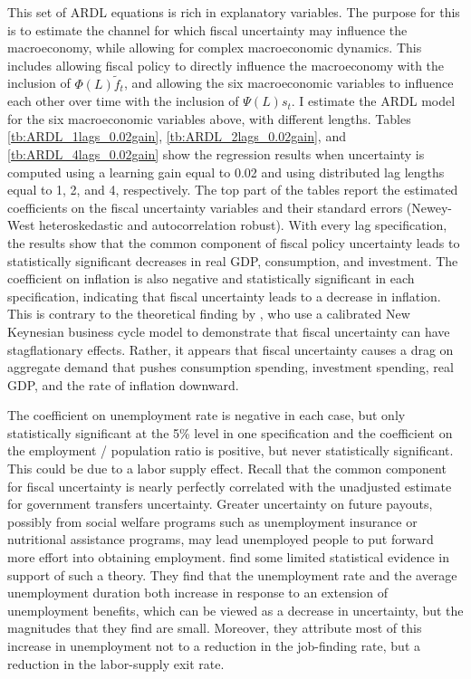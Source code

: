 \documentclass[11pt]{article}
\newcommand{\citee}[1]{\citet{#1}}
\begin{document}
This set of ARDL equations is rich in explanatory variables.  The purpose for this is to estimate the channel for which fiscal uncertainty may influence the macroeconomy, while allowing for complex macroeconomic dynamics.  This includes allowing fiscal policy to directly influence the macroeconomy with the inclusion of $\Phi(L) \tilde{f}_{t}$, and allowing the six macroeconomic variables to influence each other over time with the inclusion of $\Psi(L)s_t$.  I estimate the ARDL model for the six macroeconomic variables above, with different lengths.  Tables \ref{tb:ARDL_1lags_0.02gain}, \ref{tb:ARDL_2lags_0.02gain}, and \ref{tb:ARDL_4lags_0.02gain} show the regression results when uncertainty is computed using a learning gain equal to 0.02 and using distributed lag lengths equal to 1, 2, and 4, respectively.  The top part of the tables report the estimated coefficients on the fiscal uncertainty variables and their standard errors (Newey-West heteroskedastic and autocorrelation robust).  With every lag specification, the results show that the common component of fiscal policy uncertainty leads to statistically significant decreases in real GDP, consumption, and investment.  The coefficient on inflation is also negative and statistically significant in each specification, indicating that fiscal uncertainty leads to a decrease in inflation.  This is contrary to the theoretical finding by \citee{fvetal2011}, who use a calibrated New Keynesian business cycle model to demonstrate that fiscal uncertainty can have stagflationary effects.  Rather, it appears that fiscal uncertainty causes a drag on aggregate demand that pushes consumption spending, investment spending, real GDP, and the rate of inflation downward.  

The coefficient on unemployment rate is negative in each case, but only statistically significant at the 5\% level in one specification and the coefficient on the employment / population ratio is positive, but never statistically significant.  This could be due to a labor supply effect.  Recall that the common component for fiscal uncertainty is nearly perfectly correlated with the unadjusted estimate for government transfers uncertainty.  Greater uncertainty on future payouts, possibly from social welfare programs such as unemployment insurance or nutritional assistance programs, may lead unemployed people to put forward more effort into obtaining employment.  \citee{FarberValletta} find some limited statistical evidence in support of such a theory.  They find that the unemployment rate and the average unemployment duration both increase in response to an extension of unemployment benefits, which can be viewed as a decrease in uncertainty, but the magnitudes that they find are small.  Moreover, they attribute most of this increase in unemployment not to a reduction in the job-finding rate, but a reduction in the labor-supply exit rate.
\end{document}
